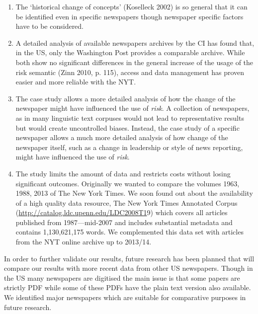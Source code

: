 \begin{enumerate}
\item The `historical change of concepts' (Koselleck 2002) is so general that it can be identified even in specific newspapers though newspaper specific factors have to be considered. 
\item A detailed analysis of available newspapers archives by the CI has found that, in the US, only the Washington Post provides a comparable archive. While both show no significant differences in the general increase of the usage of the risk semantic (Zinn 2010, p. 115), access and data management has proven easier and more reliable with the NYT. 
\item The case study allows a more detailed analysis of how the change of the newspaper might have influenced the use of \emph{risk}. A collection of newspapers, as in many linguistic text corpuses would not lead to representative results but would create uncontrolled biases. Instead, the case study of a specific newspaper allows a much more detailed analysis of how change of the newspaper itself, such as a change in leadership or style of news reporting, might have influenced the use of \emph{risk}.
\item The study limits the amount of data and restricts costs without losing significant outcomes.
Originally we wanted to compare the volumes 1963, 1988, 2013 of The New York Times. We soon found out about the availability of a high quality data resource, The New York Times Annotated Corpus (\url{http://catalog.ldc.upenn.edu/LDC2008T1}9) which covers all articles published from 1987---mid-2007 and includes substantial metadata and contains 1,130,621,175 words. We complemented this data set with articles from the NYT online archive up to 2013\slash 14.
\end{enumerate}
%
In order to further validate our results, future research has been planned that will compare our results with more recent data from other US newspapers. Though in the US many newspapers are digitised the main issue is that some papers are strictly PDF while some of these PDFs have the plain text version also available. We identified major newspapers which are suitable for comparative purposes in future research. %


